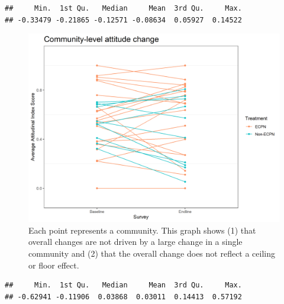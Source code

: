 \documentclass[
]{article}
\newenvironment{Shaded}{\begin{snugshade}}{\end{snugshade}}
\newcommand{\DecValTok}[1]{\textcolor[rgb]{0.00,0.00,0.81}{#1}}
\newcommand{\DocumentationTok}[1]{\textcolor[rgb]{0.56,0.35,0.01}{\textbf{\textit{#1}}}}
\newcommand{\FunctionTok}[1]{\textcolor[rgb]{0.00,0.00,0.00}{#1}}
\newcommand{\NormalTok}[1]{#1}
\newcommand{\SpecialCharTok}[1]{\textcolor[rgb]{0.00,0.00,0.00}{#1}}
\begin{document}
\begin{verbatim}
##     Min.  1st Qu.   Median     Mean  3rd Qu.     Max. 
## -0.33479 -0.21865 -0.12571 -0.08634  0.05927  0.14522
\end{verbatim}

\begin{figure}%
\centering
\includegraphics[width=\linewidth]{../survey_dat/figs/did_plots/attitudeComm.plot_disag.png}
\caption{Each point represents a community. This graph shows (1) that overall changes are not driven by a large change in a single community and (2) that the overall change does not reflect a ceiling or floor effect.}\label{fig:att_comm_dis}
\end{figure}

\begin{Shaded}
\end{Shaded}

\begin{verbatim}
##     Min.  1st Qu.   Median     Mean  3rd Qu.     Max. 
## -0.62941 -0.11906  0.03868  0.03011  0.14413  0.57192
\end{verbatim}

\begin{Shaded}
\end{Shaded}
\end{document}
